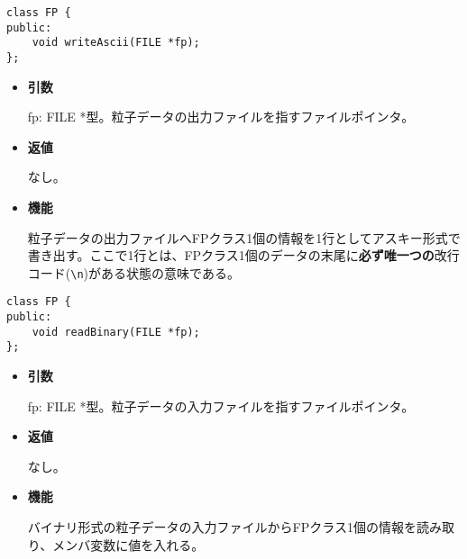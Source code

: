 \label{sec:FP_writeAscii}

\begin{screen}
\begin{verbatim}
class FP {
public:
    void writeAscii(FILE *fp);
};
\end{verbatim}
\end{screen}

\begin{itemize}

\item {\bf 引数}

  fp: FILE *型。粒子データの出力ファイルを指すファイルポインタ。
  
\item {\bf 返値}

  なし。
  
\item {\bf 機能}

  粒子データの出力ファイルへFPクラス1個の情報を1行としてアスキー形式で書き出す。ここで1行とは、FPクラス1個のデータの末尾に\textbf{必ず唯一つの}改行コード(\texttt{\textbackslash n})がある状態の意味である。
  
\end{itemize}


\label{sec:FP_readBinary}

\begin{screen}
\begin{verbatim}
class FP {
public:
    void readBinary(FILE *fp);
};
\end{verbatim}
\end{screen}

\begin{itemize}

\item {\bf 引数}

  fp: FILE *型。粒子データの入力ファイルを指すファイルポインタ。
  
\item {\bf 返値}

  なし。
  
\item {\bf 機能}

  バイナリ形式の粒子データの入力ファイルからFPクラス1個の情報を読み取り、メンバ変数に値を入れる。
  
\end{itemize}

